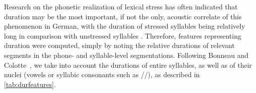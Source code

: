\documentclass[a4paper]{article}
\begin{document}
	    Research on the phonetic realization of lexical stress has often indicated that duration may be the most important, if not the only, acoustic correlate of this phenomenon in German, with the duration of stressed syllables being relatively long in comparison with unstressed syllables \cite{Dogil1999}. 
	    Therefore, features representing duration were computed, simply by noting the relative durations of relevant segments in the phone- and syllable-level segmentations. Following Bonneau and Colotte~\cite{Bonneau2011}, we take into account the durations of entire syllables, as well as of their nuclei (vowels or syllabic consonants such as //), as described in \cref{tab:durfeatures}.
	    
\end{document}
